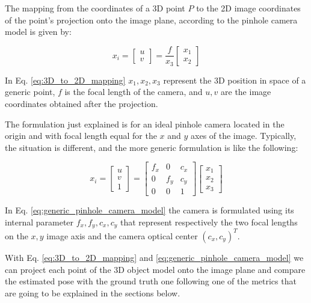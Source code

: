 The mapping from the coordinates of a 3D point $P$ to the 2D image coordinates of the point's projection onto the image plane, according to the pinhole camera model is given by:

\begin{equation}
    \label{eq:3D_to_2D_mapping}
    x_i = \left[ \begin{array}{c} u \\ v \end{array} \right] = \dfrac{f}{x_3} \left[ \begin{array}{c} x_1 \\ x_2 \end{array} \right]
\end{equation}

In Eq. \ref{eq:3D_to_2D_mapping} $x_1, x_2, x_3$ represent the 3D position in space of a generic point, $f$ is the focal length of the camera, and $u, v$ are the image coordinates obtained after the projection.

The formulation just explained is for an ideal pinhole camera located in the origin and with focal length equal for the $x$ and $y$ axes of the image. Typically, the situation is different, and the more generic formulation is like the following:

\begin{equation}
    \label{eq:generic_pinhole_camera_model}
    x_i = \left[ \begin{array}{c} u \\ v \\ 1 \end{array} \right] = \begin{bmatrix} f_x & 0 & c_x \\ 0 & f_y & c_y \\ 0 & 0 & 1 \end{bmatrix} \left[ \begin{array}{c} x_1 \\ x_2 \\ x_3 \end{array} \right]
\end{equation}

In Eq. \ref{eq:generic_pinhole_camera_model} the camera is formulated using its internal parameter $f_x, f_y, c_x, c_y$ that represent respectively the two focal lengths on the $x, y$ image axis and the camera optical center $(c_x, c_y)^T$.

With Eq. \ref{eq:3D_to_2D_mapping} and \ref{eq:generic_pinhole_camera_model} we can project each point of the 3D object model onto the image plane and compare the estimated pose with the ground truth one following one of the metrics that are going to be explained in the sections below.


